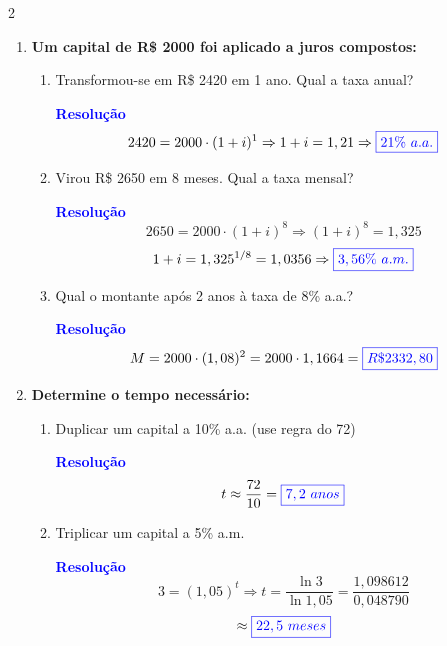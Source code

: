 \documentclass[11pt]{article}
\newcommand{\resposta}[1]{\textcolor{blue}{\boxed{#1}}}
\begin{document}
\begin{multicols}{2}
\begin{enumerate}[leftmargin=*, start=5]
\begin{enumerate}[label=\alph*)]
\item $24\%$ a.a. $\rightarrow$ taxa mensal

\textbf{\textcolor{blue}{Resolução}}
\[
    \sqrt[12]{1,24} - 1 = 1,018087 - 1 = 0,018087 \] 
\[\approx \resposta{1,81\%\ a.m.} \]

\item $1\%$ a.m. $\rightarrow$ taxa anual

\textbf{\textcolor{blue}{Resolução}}
\[
    (1,01)^{12} - 1 = 1,126825 - 1 = 0,126825 \] 
\[\approx \resposta{12,68\%\ a.a.} \]
\end{enumerate}

\item \textbf{Um capital de R\$ 2000 foi aplicado a juros compostos:}

\begin{enumerate}[label=\alph*)]
\item Transformou-se em R\$ 2420 em 1 ano. Qual a taxa anual?

\textbf{\textcolor{blue}{Resolução}}
\[
2420 = 2000 \cdot (1 + i)^1 \Rightarrow 1 + i = 1,21 \Rightarrow \resposta{21\%\ a.a.}
\]

\item Virou R\$ 2650 em 8 meses. Qual a taxa mensal?

\textbf{\textcolor{blue}{Resolução}}
\[
2650 = 2000 \cdot (1 + i)^8 \Rightarrow (1 + i)^8 = 1,325
\]
\[
1 + i = 1,325^{1/8} = 1,0356 \Rightarrow \resposta{3,56\%\ a.m.}
\]

\item Qual o montante após 2 anos à taxa de 8\% a.a.?

\textbf{\textcolor{blue}{Resolução}}
\[
M = 2000 \cdot (1,08)^2 = 2000 \cdot 1,1664 = \resposta{R\$ 2332,80}
\]
\end{enumerate}

\item \textbf{Determine o tempo necessário:}

\begin{enumerate}[label=\alph*)]
\item Duplicar um capital a 10\% a.a. (use regra do 72)

\textbf{\textcolor{blue}{Resolução}}
\[
t \approx \frac{72}{10} = \resposta{7,2\ anos}
\]

\item Triplicar um capital a 5\% a.m.

\textbf{\textcolor{blue}{Resolução}}
\[
3 = (1,05)^t \Rightarrow t = \frac{\ln 3}{\ln 1,05} = \frac{1,098612}{0,048790} \]
\[ \approx \resposta{22,5\ meses} \]



\end{enumerate}
\end{enumerate}
\end{multicols}
\end{document}
